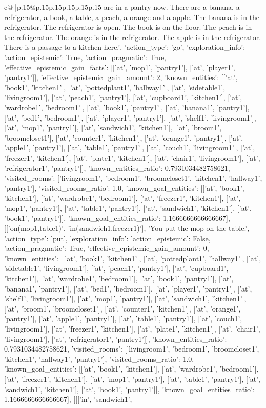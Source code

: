 \documentclass{article}
\begin{document}
{\begin{supertabular}{c@{$\;$}|p{.15\linewidth}@{}p{.15\linewidth}p{.15\linewidth}p{.15\linewidth}p{.15\linewidth}p{.15\linewidth}}
{{{are in a pantry now. There are a banana, a refrigerator, a book, a table, a peach, a orange and a apple. The banana is in the refrigerator. The refrigerator is open. The book is on the floor. The peach is in the refrigerator. The orange is in the refrigerator. The apple is in the refrigerator. There is a passage to a kitchen here.', {'action_type': 'go', 'exploration_info': {'action_epistemic': True, 'action_pragmatic': True, 'effective_epistemic_gain_facts': [['at', 'mop1', 'pantry1'], ['at', 'player1', 'pantry1']], 'effective_epistemic_gain_amount': 2, 'known_entities': [['at', 'book1', 'kitchen1'], ['at', 'pottedplant1', 'hallway1'], ['at', 'sidetable1', 'livingroom1'], ['at', 'peach1', 'pantry1'], ['at', 'cupboard1', 'kitchen1'], ['at', 'wardrobe1', 'bedroom1'], ['at', 'book1', 'pantry1'], ['at', 'banana1', 'pantry1'], ['at', 'bed1', 'bedroom1'], ['at', 'player1', 'pantry1'], ['at', 'shelf1', 'livingroom1'], ['at', 'mop1', 'pantry1'], ['at', 'sandwich1', 'kitchen1'], ['at', 'broom1', 'broomcloset1'], ['at', 'counter1', 'kitchen1'], ['at', 'orange1', 'pantry1'], ['at', 'apple1', 'pantry1'], ['at', 'table1', 'pantry1'], ['at', 'couch1', 'livingroom1'], ['at', 'freezer1', 'kitchen1'], ['at', 'plate1', 'kitchen1'], ['at', 'chair1', 'livingroom1'], ['at', 'refrigerator1', 'pantry1']], 'known_entities_ratio': 0.7931034482758621, 'visited_rooms': ['livingroom1', 'bedroom1', 'broomcloset1', 'kitchen1', 'hallway1', 'pantry1'], 'visited_rooms_ratio': 1.0, 'known_goal_entities': [['at', 'book1', 'kitchen1'], ['at', 'wardrobe1', 'bedroom1'], ['at', 'freezer1', 'kitchen1'], ['at', 'mop1', 'pantry1'], ['at', 'table1', 'pantry1'], ['at', 'sandwich1', 'kitchen1'], ['at', 'book1', 'pantry1']], 'known_goal_entities_ratio': 1.1666666666666667}}], [['on(mop1,table1)', 'in(sandwich1,freezer1)'], 'You put the mop on the table.', {'action_type': 'put', 'exploration_info': {'action_epistemic': False, 'action_pragmatic': True, 'effective_epistemic_gain_amount': 0, 'known_entities': [['at', 'book1', 'kitchen1'], ['at', 'pottedplant1', 'hallway1'], ['at', 'sidetable1', 'livingroom1'], ['at', 'peach1', 'pantry1'], ['at', 'cupboard1', 'kitchen1'], ['at', 'wardrobe1', 'bedroom1'], ['at', 'book1', 'pantry1'], ['at', 'banana1', 'pantry1'], ['at', 'bed1', 'bedroom1'], ['at', 'player1', 'pantry1'], ['at', 'shelf1', 'livingroom1'], ['at', 'mop1', 'pantry1'], ['at', 'sandwich1', 'kitchen1'], ['at', 'broom1', 'broomcloset1'], ['at', 'counter1', 'kitchen1'], ['at', 'orange1', 'pantry1'], ['at', 'apple1', 'pantry1'], ['at', 'table1', 'pantry1'], ['at', 'couch1', 'livingroom1'], ['at', 'freezer1', 'kitchen1'], ['at', 'plate1', 'kitchen1'], ['at', 'chair1', 'livingroom1'], ['at', 'refrigerator1', 'pantry1']], 'known_entities_ratio': 0.7931034482758621, 'visited_rooms': ['livingroom1', 'bedroom1', 'broomcloset1', 'kitchen1', 'hallway1', 'pantry1'], 'visited_rooms_ratio': 1.0, 'known_goal_entities': [['at', 'book1', 'kitchen1'], ['at', 'wardrobe1', 'bedroom1'], ['at', 'freezer1', 'kitchen1'], ['at', 'mop1', 'pantry1'], ['at', 'table1', 'pantry1'], ['at', 'sandwich1', 'kitchen1'], ['at', 'book1', 'pantry1']], 'known_goal_entities_ratio': 1.1666666666666667}}], [[['in', 'sandwich1', }}}
\end{supertabular}}
\end{document}

